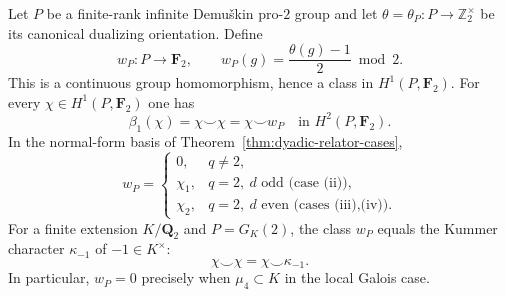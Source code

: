 \begin{theorem}
\label{thm:dyadic-fox-wu-bockstein}
Let $P$ be a finite-rank infinite Demu\v{s}kin pro-$2$ group
and let $\theta=\theta_P:P\to\mathbb Z_2^\times$
be its canonical dualizing orientation.  Define
\begin{equation}\label{eq:dyadic-fox-wu-class}
w_P:P\longrightarrow\mathbf F_2,\qquad
w_P(g)=\frac{\theta(g)-1}{2}\bmod2.
\end{equation}
This is a continuous group homomorphism, hence a class in
$H^1(P,\mathbf F_2)$.  For every
$\chi\in H^1(P,\mathbf F_2)$ one has
\begin{equation}\label{eq:dyadic-fox-wu-identity}
\boxed{\qquad
\beta_1(\chi)=\chi\smile\chi=\chi\smile w_P
\quad\text{in }H^2(P,\mathbf F_2).\qquad}
\end{equation}
In the normal-form basis of
Theorem~\ref{thm:dyadic-relator-cases},
\begin{equation}\label{eq:dyadic-wu-basis-values}
w_P=
\begin{cases}
0,&q\ne2,\\
\chi_1,&q=2,\ d\text{ odd (case (ii))},\\
\chi_2,&q=2,\ d\text{ even (cases (iii),(iv))}.
\end{cases}
\end{equation}
For a finite extension $K/\mathbf Q_2$ and
$P=G_K(2)$, the class $w_P$ equals the
Kummer character $\kappa_{-1}$ of $-1\in K^\times$:
\begin{equation}\label{eq:dyadic-kummer-minus-one}
\chi\smile\chi=\chi\smile\kappa_{-1}.
\end{equation}
In particular, $w_P=0$ precisely when $\mu_4\subset K$
in the local Galois case.
\end{theorem}

